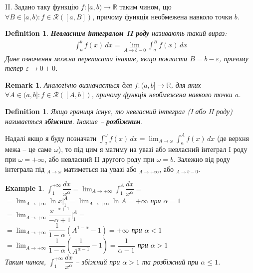 \documentclass[a4paper, 10pt]{article}
\def\huge{\displaystyle}
\theoremstyle{theoremdd}
\theoremstyle{theoremdd}
\theoremstyle{theoremdd}
\newtheorem{definition}[theorem]{Definition}
\theoremstyle{theoremdd}
\theoremstyle{theoremdd}
\newtheorem{example}[theorem]{Example}
\theoremstyle{theoremdd}
\theoremstyle{theoremdd}
\newtheorem{remark}[theorem]{Remark}
\theoremstyle{theoremdd}
\theoremstyle{theoremdd}
\begin{document}
II. Задано таку функцію $f \colon [a,b) \to \mathbb{R}$ таким чином, що $\forall B \in [a,b): f \in \mathcal{R}([a,B])$, причому функція необмежена навколо точки $b$.
\begin{definition}
\textbf{Невласним інтегралом II роду} називають такий вираз:
\begin{align*}
\int_a^b f(x)\,dx = \lim_{A \to b-0} \int_a^{B} f(x)\,dx
\end{align*}
Дане означення можна переписати інакше, якщо покласти $B = b-\varepsilon$, причому тепер $\varepsilon \to 0+0$.
\end{definition}

\begin{remark}
Аналогічно визначається для $f \colon (a,b] \to \mathbb{R}$, для яких $\forall A \in (a,b]: f \in \mathcal{R}([A,b])$, причому функція необмежена навколо точки $a$.
\end{remark}

\begin{definition}
Якщо границя існує, то невласний інтеграл (I або II роду) називається \textbf{збіжним}. Інакше -- \textbf{розбіжним}.
\end{definition}

Надалі якщо я буду позначати $\displaystyle\int_a^\omega f(x)\,dx = \displaystyle\lim_{A \to \omega} \int_a^A f(x)\,dx$ (де верхня межа -- це саме $\omega$), то під цим я матиму на увазі або невласний інтеграл I роду при $\omega = +\infty$, або невласний II другого роду при $\omega = b$. Залежно від роду інтеграла під ${}_{A \to \omega}$ матиметься на увазі або ${}_{A \to +\infty}$, або ${}_{A \to b-0}$.

\begin{example}
$\huge\int_1^{+\infty} \dfrac{dx}{x^\alpha} = \huge\lim_{A \to +\infty} \int_1^A \dfrac{dx}{x^\alpha} \boxed{=}$\\
$= \huge\lim_{A \to +\infty} \ln x \Big|_1^A = \lim_{A \to +\infty} \ln A = +\infty$ при $\alpha = 1$\\
$= \huge\lim_{A \to +\infty} \dfrac{x^{-\alpha+1}}{-\alpha+1} \Big|_1^A =$\\
$= \huge\lim_{A \to +\infty} \dfrac{1}{1-\alpha} \left(A^{1-\alpha} - 1 \right) = +\infty$ при $\alpha < 1$\\
$= \huge\lim_{A \to +\infty} \dfrac{1}{1-\alpha} \left(\dfrac{1}{A^{\alpha-1}} - 1\right) = \dfrac{1}{\alpha - 1}$ при $\alpha > 1$\\
Таким чином, $\huge\int_1^{+\infty} \dfrac{dx}{x^\alpha}$ -- збіжний при $\alpha > 1$ та розбіжний при $\alpha \leq 1$.
\end{example}
\end{document}
